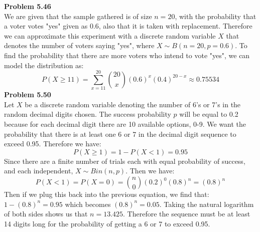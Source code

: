 \documentclass{article}
\begin{document}
\noindent\textbf{Problem 5.46}\\
We are given that the sample gathered is of size $n=20$, with the probability that a voter votes "yes" given as 0.6, also that it is taken with replacement. Therefore we can approximate this experiment with a discrete random variable $X$ that denotes the number of voters saying "yes", where $X\sim B(n=20,p=0.6)$. To find the probability that there are more voters who intend to vote "yes", we can model the distribution as:
$$ P(X\geq11) = \sum_{x=11}^{20} \binom{20}{x}(0.6)^{x}(0.4)^{20-x} \approx 0.75534$$
\noindent\textbf{Problem 5.50}\\
Let $X$ be a discrete random variable denoting the number of 6's or 7's in the random decimal digits chosen. The success probability $p$ will be equal to 0.2 because for each decimal digit there are 10 available options, 0-9. We want the probability that there is at least one 6 or 7 in the decimal digit sequence to exceed 0.95. Therefore we have:
$$P(X\geq 1) = 1-P(X<1) = 0.95 $$
Since there are a finite number of trials each with equal probability of success, and each independent, $X\sim Bin(n,p)$. Then we have:
$$ P(X<1) = P(X=0) = \binom{n}{0}(0.2)^0(0.8)^n = (0.8)^n$$
Then if we plug this back into the previous equation, we find that:
$ 1-(0.8)^n = 0.95$ which becomes $(0.8)^n = 0.05$. Taking the natural logarithm of both sides shows us that $n=13.425$. Therefore the sequence must be at least 14 digits long for the probability of getting a 6 or 7 to exceed 0.95. 
\end{document}
